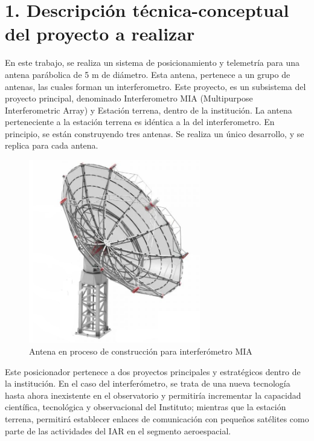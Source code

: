 \documentclass[11pt, %
codirector, %
]{charter}
\begin{document}
\section{1. Descripción técnica-conceptual del proyecto a realizar}
\label{sec:descripcion}

En este trabajo, se realiza un sistema de posicionamiento y telemetría para una antena parábolica de 5 m de diámetro. Esta antena, pertenece a un grupo de antenas, las cuales forman un interferometro. Este proyecto, es un subsistema del proyecto principal, denominado Interferometro MIA (Multipurpose Interferometric Array) y Estación terrena, dentro de la institución. La antena perteneciente a la estación terrena es idéntica a la del interferometro. En principio, se están construyendo tres antenas. Se realiza un único desarrollo, y se replica para cada antena.  
\begin{figure}[H]
	\centering 
	\includegraphics[height = 8cm ]{Figuras/seccion_1/antena_MIA.png}
	\caption{Antena en proceso de construcción para interferómetro MIA}
	\label{fig:antena_mia}
\end{figure}

Este posicionador pertenece a dos proyectos principales y estratégicos dentro de la institución. 
En el caso del interferómetro, se trata de una nueva tecnología hasta ahora inexistente en el observatorio y permitiría incrementar la capacidad científica, tecnológica y observacional del Instituto; mientras que la estación terrena, permitirá establecer enlaces de comunicación con pequeños satélites como parte de las actividades del IAR en el segmento aeroespacial.
\end{document}
